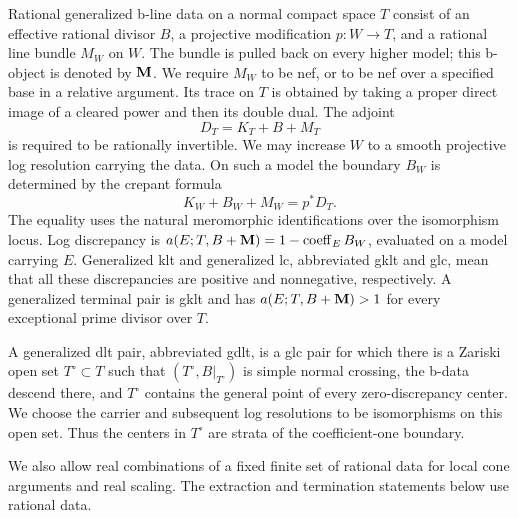 \begin{definition}\label{def:generalized-data}
Rational generalized b-line data on a normal compact space $T$ consist
of an effective rational divisor $B$, a projective modification
$p\colon W\to T$, and a rational line bundle $M_W$ on $W$.
The bundle is pulled back on every higher model; this b-object is denoted
by $\mathbf M$.  We require $M_W$ to be nef, or to be nef over a specified
base in a relative argument.  Its trace on $T$ is obtained by taking a
proper direct image of a cleared power and then its double dual.  The
adjoint
\[
 D_T=K_T+B+M_T
\]
is required to be rationally invertible.  We may increase $W$ to a smooth
projective log resolution carrying the data.  On such a model the
boundary $B_W$ is determined by the crepant formula
\begin{equation}\label{eq:generalized-crepant}
 K_W+B_W+M_W=p^*D_T.
\end{equation}
The equality uses the natural meromorphic identifications over the
isomorphism locus.  Log discrepancy is
$a(E;T,B+\mathbf M)=1-\operatorname{coeff}_E B_W$, evaluated on a model
carrying $E$.  Generalized klt and generalized lc, abbreviated gklt and
glc, mean that all these discrepancies are positive and nonnegative,
respectively.  A generalized terminal pair is gklt and has
$a(E;T,B+\mathbf M)>1$ for every exceptional prime divisor over $T$.

A generalized dlt pair, abbreviated gdlt, is a glc pair for which there
is a Zariski open set $T^\circ\subset T$ such that
$(T^\circ,B|_{T^\circ})$ is simple normal crossing, the b-data descend
there, and $T^\circ$ contains the general point of every
zero-discrepancy center.  We choose the carrier and subsequent log
resolutions to be isomorphisms on this open set.  Thus the centers in
$T^\circ$ are strata of the coefficient-one boundary.
\end{definition}

We also allow real combinations of a fixed finite set of rational data
for local cone arguments and real scaling. The extraction and termination
statements below use rational
data.

